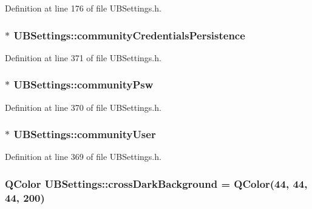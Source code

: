 Definition at line 176 of file U\-B\-Settings.\-h.

\hypertarget{class_u_b_settings_a28cdd1c327f6b9f8228b0e76a24de0d8}{
\subsubsection[{community\-Credentials\-Persistence}]{$\ast$ U\-B\-Settings\-::community\-Credentials\-Persistence}}\label{db/d66/class_u_b_settings_a28cdd1c327f6b9f8228b0e76a24de0d8}


Definition at line 371 of file U\-B\-Settings.\-h.

\hypertarget{class_u_b_settings_a23ae0e9782365ef8baeff3618292ceb5}{
\subsubsection[{community\-Psw}]{$\ast$ U\-B\-Settings\-::community\-Psw}}\label{db/d66/class_u_b_settings_a23ae0e9782365ef8baeff3618292ceb5}


Definition at line 370 of file U\-B\-Settings.\-h.

\hypertarget{class_u_b_settings_ae56024b1544199d1e60fe5a7b00e04fa}{
\subsubsection[{community\-User}]{$\ast$ U\-B\-Settings\-::community\-User}}\label{db/d66/class_u_b_settings_ae56024b1544199d1e60fe5a7b00e04fa}


Definition at line 369 of file U\-B\-Settings.\-h.

\hypertarget{class_u_b_settings_abb114084da6714ad6196e6af1a6d2760}{
\subsubsection[{cross\-Dark\-Background}]{\setlength{\rightskip}{0pt plus 5cm}Q\-Color U\-B\-Settings\-::cross\-Dark\-Background = Q\-Color(44, 44, 44, 200)\hspace{0.3cm}{\ttfamily [static]}}}\label{db/d66/class_u_b_settings_abb114084da6714ad6196e6af1a6d2760}


